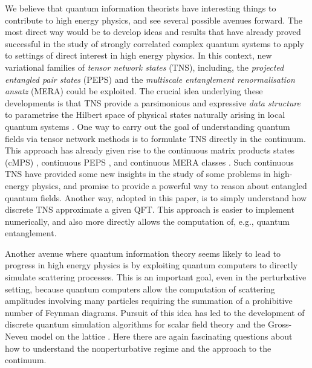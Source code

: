 \documentclass[11pt]{amsart}
\theoremstyle{plain}%
\theoremstyle{definition}
\theoremstyle{remark}
\begin{document}
We believe that quantum information theorists have interesting things to contribute to high energy physics, and see several possible avenues forward. The most direct way would be to develop ideas and results that have already proved successful in the study of strongly correlated complex quantum systems to apply to settings of direct interest in high energy physics. In this context, new variational families of \emph{tensor network states} (TNS), including, the \emph{projected entangled pair states} (PEPS) \cite{verstraete_renormalization_2004} and the \emph{multiscale entanglement renormalisation ansatz} (MERA) \cite{vidal_entanglement_2007,vidal_class_2008} could be exploited. The crucial idea underlying these developments is that TNS provide a parsimonious and expressive \emph{data structure} to parametrise  the Hilbert space of physical states naturally arising \cite{poulin_quantum_2011} in local quantum systems \cite{orus_practical_2014, haegeman_geometry_2014,osborne_simulating_2007,bravyi_topological_2010,bravyi_short_2011,hastings_lieb-schultz-mattis_2004,hastings_area_2007,osborne_efficient_2006}. One way to carry out the goal of understanding quantum fields via tensor network methods is to formulate TNS directly in the continuum. This approach has already given rise to the continuous matrix products states (cMPS) \cite{verstraete_continuous_2010,osborne_holographic_2010, haegeman_calculus_2013}, continuous PEPS \cite{jennings_variational_2012}, and continuous MERA classes \cite{haegeman_entanglement_2013}. Such continuous TNS have provided some new insights in the study of some problems in high-energy physics, and promise to provide a powerful way to reason about entangled quantum fields. Another way, adopted in this paper, is to simply understand how discrete TNS approximate a given QFT. This approach is easier to implement numerically, and also more directly allows the computation of, e.g., quantum entanglement.

Another avenue where quantum information theory seems likely to lead to progress in high energy physics is by exploiting quantum computers to directly simulate scattering processes. This is an important goal, even in the perturbative setting, because quantum computers allow the computation of scattering amplitudes involving many particles requiring the summation of a prohibitive number of Feynman diagrams. Pursuit of this idea has led to the development of discrete quantum simulation algorithms for scalar field theory \cite{jordan_quantum_2012,jordan_quantum_2011} and the Gross-Neveu model on the lattice \cite{jordan_quantum_2014}. Here there are again fascinating questions about how to understand the nonperturbative regime and the approach to the continuum.  
\end{document}
